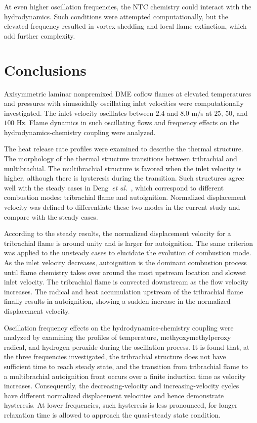 \documentclass[review,3p,times]{elsarticle}
\begin{document}
\textcolor{Rev1}{At even higher oscillation frequencies, the NTC chemistry could interact with the hydrodynamics.  Such conditions were attempted computationally, but the elevated frequency resulted in vortex shedding and local flame extinction, which add further complexity.}


\section{Conclusions}

Axisymmetric laminar nonpremixed DME coflow flames at elevated temperatures and pressures with sinusoidally oscillating inlet velocities were computationally investigated.  The inlet velocity oscillates between $2.4$ and $8.0$ m/s at $25$, $50$, and $100$ Hz.  Flame dynamics in such oscillating flows and frequency effects on the hydrodynamics-chemistry coupling were analyzed.

The heat release rate profiles were examined to describe the thermal structure.  The morphology of the thermal structure transitions between tribrachial and multibrachial.  The multibrachial structure is favored when the inlet velocity is higher, although there is hysteresis during the transition.  Such structures agree well with the steady cases in Deng~\emph{et al.}~\cite{deng15b}, which correspond to different combustion modes: tribrachial flame and autoignition.  Normalized displacement velocity was defined to differentiate these two modes in the current study and compare with the steady cases.  

According to the steady results, the normalized displacement velocity for a tribrachial flame is around unity and is larger for autoignition.  The same criterion was applied to the unsteady cases to elucidate the evolution of combustion mode.  As the inlet velocity decreases, autoignition is the dominant combustion process until flame chemistry takes over around the most upstream location and slowest inlet velocity.  The tribrachial flame is convected downstream as the flow velocity increases.  The radical and heat accumulation upstream of the tribrachial flame finally results in autoignition, showing a sudden increase in the normalized displacement velocity.  

\textcolor{Rev1}{Oscillation frequency effects on the hydrodynamics-chemistry coupling were analyzed by examining the profiles of temperature, methyoxymethylperoxy radical, and hydrogen peroxide during the oscillation process.  It is found that, at the three frequencies investigated, the tribrachial structure does not have sufficient time to reach steady state, and the transition from tribrachial flame to a multibrachial autoignition front occurs over a finite induction time as velocity increases.  Consequently, the decreasing-velocity and increasing-velocity cycles have different normalized displacement velocities and hence demonstrate hysteresis.  At lower frequencies, such hysteresis is less pronounced, for longer relaxation time is allowed to approach the quasi-steady state condition.}  
\end{document}

